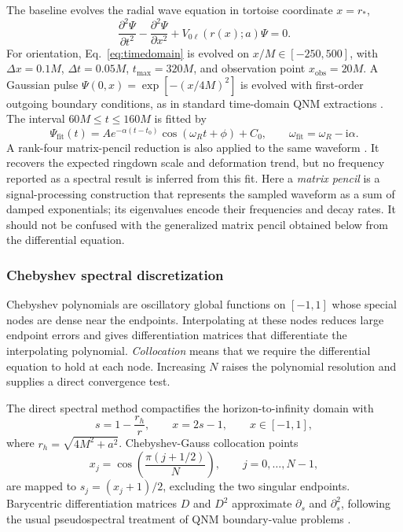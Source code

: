 \documentclass[12pt,a4paper]{article}
\newcommand{\ii}{\mathrm{i}}
\begin{document}
The baseline evolves the radial wave equation in tortoise coordinate \(x=r_*\),
\begin{equation}
\frac{\partial^2\Psi}{\partial t^2}
-
\frac{\partial^2\Psi}{\partial x^2}
+
V_{0\ell}(r(x);a)\Psi=0.
\label{eq:timedomain}
\end{equation}
For orientation, Eq.~\eqref{eq:timedomain} is evolved on
\(x/M\in[-250,500]\), with \(\Delta x=0.1M\), \(\Delta t=0.05M\),
\(t_{\max}=320M\), and observation point \(x_{\mathrm{obs}}=20M\). A Gaussian
pulse \(\Psi(0,x)=\exp[-(x/4M)^2]\) is evolved with first-order outgoing
boundary conditions, as in standard time-domain QNM extractions
\cite{Gundlach1994,Konoplya2011,Konoplya2020}. The interval \(60M\leq t\leq160M\) is fitted by
\begin{equation*}
\Psi_{\mathrm{fit}}(t)=A e^{-\alpha(t-t_0)}
\cos(\omega_R t+\phi)+C_0,
\qquad
\omega_{\mathrm{fit}}=\omega_R-\ii\alpha.
\end{equation*}
A rank-four matrix-pencil reduction is also applied to the same waveform
\cite{Hua1990}. It
recovers the expected ringdown scale and deformation trend, but no frequency
reported as a spectral result is inferred from this fit.
Here a \emph{matrix pencil} is a signal-processing construction that represents
the sampled waveform as a sum of damped exponentials; its eigenvalues encode
their frequencies and decay rates.  It should not be confused with the
generalized matrix pencil obtained below from the differential equation.

\subsubsection{Chebyshev spectral discretization}

Chebyshev polynomials are oscillatory global functions on \([-1,1]\) whose
special nodes are dense near the endpoints.  Interpolating at these nodes
reduces large endpoint errors and gives differentiation matrices that
differentiate the interpolating polynomial.  \emph{Collocation} means that we
require the differential equation to hold at each node.  Increasing \(N\)
raises the polynomial resolution and supplies a direct convergence test.

The direct spectral method compactifies the horizon-to-infinity domain with
\begin{equation*}
s=1-\frac{r_h}{r},\qquad x=2s-1,\qquad x\in[-1,1],
\end{equation*}
where \(r_h=\sqrt{4M^2+a^2}\). Chebyshev-Gauss collocation points
\begin{equation*}
x_j=\cos\left(\frac{\pi(j+1/2)}{N}\right),\qquad j=0,\ldots,N-1,
\end{equation*}
are mapped to \(s_j=(x_j+1)/2\), excluding the two singular endpoints.
Barycentric differentiation matrices \(D\) and \(D^2\) approximate
\(\partial_s\) and \(\partial_s^2\), following the usual pseudospectral
treatment of QNM boundary-value problems \cite{Jansen2017}.
\end{document}
